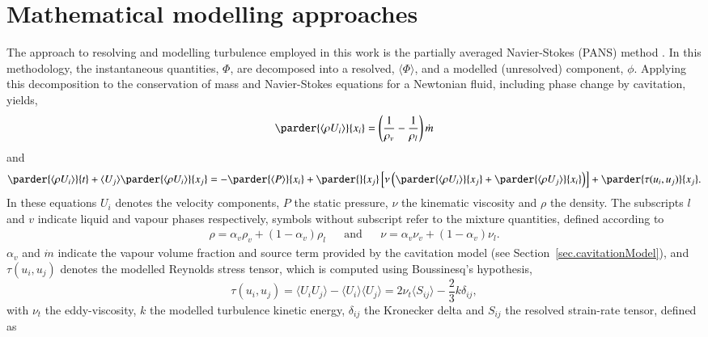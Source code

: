 \documentclass[a4paper,10pt,preprint,3p]{elsarticle}
\begin{document}
\section{Mathematical modelling approaches}
\label{sec.turbulenceModels}
The approach to resolving and modelling turbulence employed in this work is the partially averaged Navier-Stokes (PANS) method \cite{girimaji2005partially}. In this methodology, the instantaneous quantities, $\Phi$, are decomposed into a resolved, $\langle\Phi\rangle$, and a modelled (unresolved) component, $\phi$. Applying this decomposition to the conservation of mass and Navier-Stokes equations for a Newtonian fluid, including phase change by cavitation, yields,
\begin{equation}\label{eq.continuity}
	\parder{\langle \rho U_i\rangle}{x_i} = \left(\frac{1}{\rho_v} - \frac{1}{\rho_l}\right) \dot{m}
\end{equation}
and
\begin{equation}
\parder{\langle \rho U_i \rangle}{t} + \langle U_j \rangle \parder{\langle \rho U_i \rangle}{x_j} = -\parder{\langle P \rangle}{x_i} + \parder{}{x_j} \left[\nu \left(\parder{\langle \rho U_i \rangle}{x_j} + \parder{\langle \rho U_j \rangle}{x_i}\right)\right]  + \parder{\tau (u_i,u_j)}{x_j}.
\end{equation}
In these equations $U_i$ denotes the velocity components, $P$ the static pressure, $\nu$ the kinematic viscosity and $\rho$ the density. The subscripts $l$ and $v$ indicate liquid and vapour phases respectively, symbols without subscript refer to the mixture quantities, defined according to
\begin{align}\label{eq.mixtureProperties}
\rho = \alpha_v \rho_v + \left(1-\alpha_v\right) \rho_l && \mathrm{and} && \nu = \alpha_v \nu_v + \left(1-\alpha_v\right) \nu_l.
\end{align}
$\alpha_v$ and $\dot{m}$ indicate the vapour volume fraction and source term provided by the cavitation model (see Section~\ref{sec.cavitationModel}), and $\tau (u_i,u_j)$ denotes the modelled Reynolds stress tensor, which is computed using Boussinesq's hypothesis,
\begin{equation}\label{eq.Boussinesq}
\tau (u_i,u_j) = \langle U_i U_j \rangle - \langle U_i \rangle \langle U_j \rangle = 2 \nu_t \langle S_{ij} \rangle - \frac{2}{3} k \delta_{ij},
\end{equation}
with $\nu_t$ the eddy-viscosity, $k$ the modelled turbulence kinetic energy, $\delta_{ij}$ the Kronecker delta and $S_{ij}$ the resolved strain-rate tensor, defined as
\end{document}
